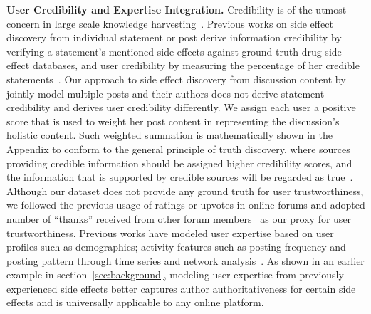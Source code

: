 \documentclass{bmcart}
\begin{document}
{\bf User Credibility and Expertise Integration.}
Credibility is of the utmost concern in large scale knowledge harvesting~\cite{hajli2015credibility,mukherjee2015leveraging,popat2016credibility}. Previous works on side effect discovery from individual statement or post derive information credibility by verifying a statement's mentioned side effects against ground truth drug-side effect databases, and user credibility by measuring the percentage of her credible statements~\cite{mukherjee2014people,li2017reliable}. Our approach to side effect discovery from discussion content by jointly model multiple posts and their authors does not derive statement credibility and derives user credibility differently. We assign each user a positive score that is used to weight her post content in representing the discussion's holistic content. Such weighted summation is mathematically shown in the Appendix to conform to the general principle of truth discovery, where sources providing credible information should be assigned higher credibility scores, and the information that is supported by credible sources will be
regarded as true~\cite{li2016survey}. Although our dataset does not provide any ground truth for user trustworthiness, we followed the previous usage of ratings or upvotes in online forums and adopted number of ``thanks'' received from other forum members~\cite{rains2009health} as our proxy for user trustworthiness. Previous works have modeled user expertise based on user profiles such as demographics; activity features such as posting frequency and posting pattern through time series and network analysis~\cite{mukherjee2014people, vydiswaran2019identifying}. As shown in an earlier example in section~\ref{sec:background}, modeling user expertise from previously experienced side effects better captures author authoritativeness for certain side effects and is universally applicable to any online platform. \\
\end{document}

